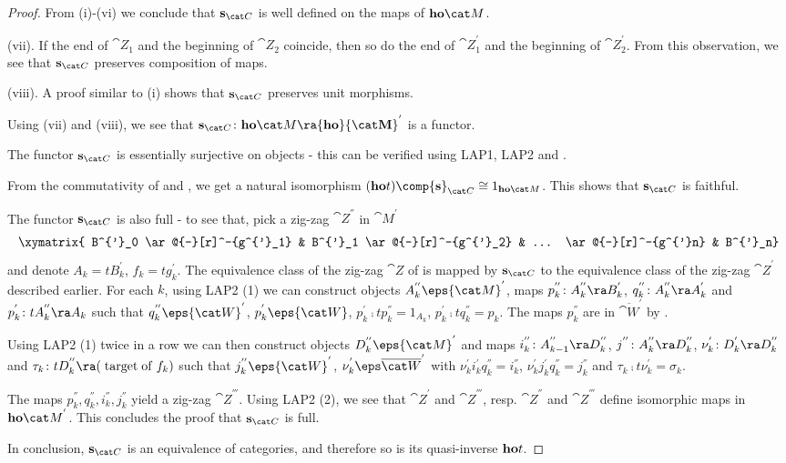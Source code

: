 \begin{proof}
From (i)-(vi) we conclude that ${\bf s}_{\cat C}$ is well defined on the maps of ${\bf ho}{\cat M}$.

(vii). If the end of ${\cat Z}_1$ and the beginning of ${\cat Z}_2$ coincide, then so do the end of ${\cat Z}^{'}_1$ and the beginning of ${\cat Z}^{'}_2$. From this observation, we see that ${\bf s}_{\cat C}$ preserves composition of maps.

(viii). A proof similar to (i) shows that ${\bf s}_{\cat C}$ preserves unit morphisms.

Using (vii) and (viii), we see that ${\bf s}_{\cat C} \colon {\bf ho}{\cat M} \ra {\bf ho}{\cat M}^{'}$ is a functor.

The functor ${\bf s}_{\cat C}$ is essentially surjective on objects - this can be verified using LAP1, LAP2 and .

From the commutativity of  and , we get a natural isomorphism $({\bf ho} t) \comp {\bf s}_{\cat C} \cong 1_{{\bf ho}{\cat M}}$. This shows that ${\bf s}_{\cat C}$ is faithful. 

The functor ${\bf s}_{\cat C}$ is also full - to see that, pick a zig-zag ${\cat Z}^{''}$ in ${\cat M}^{'}$
\[
\xymatrix{ B^{'}_0 \ar@{-}[r]^-{g^{'}_1} &  B^{'}_1 \ar@{-}[r]^-{g^{'}_2} & ... \ar@{-}[r]^-{g^{'}n} & B^{'}_n}
\]
and denote $A_k = tB^{'}_k$, $f_k = tg^{'}_k$. The equivalence class of the zig-zag ${\cat Z}$ of  is mapped by ${\bf s}_{\cat C}$ to the equivalence class of the zig-zag ${\cat Z}^{'}$ described earlier. For each $k$, using LAP2 (1) we can construct objects $A^{''}_k \eps {\cat M}^{'}$, maps $p^{''}_k \colon A^{''}_k \ra  B^{'}_k$, $q^{''}_k \colon A^{''}_k \ra  A^{'}_k$ and $p^{'}_k \colon tA^{''}_k \ra A_k$  such that $q^{''}_k \eps {\cat W}^{'}$, $p^{'}_k \eps {\cat W}$, $p^{'}_k \comp tp^{''}_k = 1_{A_k}$, $p^{'}_k \comp tq^{''}_k = p_k$. The maps $p^{''}_k$ are in $\overline{\cat W}^{'}$ by . 

Using LAP2 (1) twice in a row we can then construct objects $D^{''}_k \eps {\cat M}^{'}$ and maps $i^{''}_k \colon A^{''}_{k-1} \ra D^{''}_k$, $j^{''} \colon A^{''}_k \ra D^{''}_k$, $\nu^{'}_k \colon D^{'}_k \ra D^{''}_k$ and $\tau_k \colon tD^{''}_k \ra (\mathrm{\; target \; of \; }f_k)$ such that $j^{''}_k \eps {\cat W}^{'}$, $\nu^{'}_k \eps \overline{\cat W}^{'}$ with $\nu^{'}_k i^{'}_k q^{''}_k = i^{''}_k$, $\nu^{'}_k j^{'}_k q^{''}_k = j^{''}_k$ and $\tau_k \comp t \nu^{'}_k = \sigma_k$. 

The maps $p^{''}_k, q^{''}_k, i^{''}_k, j^{''}_k $ yield a zig-zag ${\cat Z}^{'''}$. Using LAP2 (2), we see that ${\cat Z}^{'}$ and ${\cat Z}^{'''}$, resp. ${\cat Z}^{''}$ and ${\cat Z}^{'''}$ define isomorphic maps in ${\bf ho}{\cat M}^{'}$. This concludes the proof that ${\bf s}_{\cat C}$ is full.

In conclusion, ${\bf s}_{\cat C}$ is an equivalence of categories, and therefore so is its quasi-inverse ${\bf ho}t$.
\end{proof}

